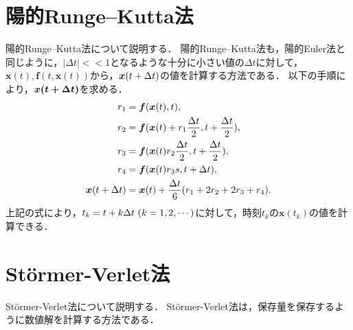 \section{陽的Runge--Kutta法}
陽的Runge--Kutta法について説明する．
陽的Runge--Kutta法も，陽的Euler法と同じように，$|\Delta t| << 1 $となるような十分に小さい値の$\Delta t$に対して，$\bm{x}(t),\bm{f}(t,\bm{x}(t))$から，$\bm{x}(t + \Delta t )$の値を計算する方法である．
以下の手順により，$\bm{x(t + \Delta t)}$を求める．
\begin{align}
    r_1 &= \bm{f}(\bm{x}(t),t), \\
    r_2 &= \bm{f}(\bm{x}(t)+r_1 \frac{\Delta t}{2},t + \frac{\Delta t}{2}), \\
    r_3 &= \bm{f}(\bm{x}(t)r_2 \frac{\Delta t}{2}, t + \frac{\Delta t}{2}), \\
    r_4 &= \bm{f}(\bm{x}(t)r_3 s, t + \Delta t), \\
    \bm{x}(t + \Delta t) &= \bm{x}(t) + \frac{\Delta t}{6}(r_1 + 2r_2 + 2r_3 + r_4).
\end{align}
上記の式により，$t_k = t + k\Delta t \ (k = 1,2,\cdots)$に対して，時刻$t_k$の$\bm{x}(t_k)$の値を計算できる．


\section{St\"ormer-Verlet法}
St\"ormer-Verlet法について説明する．
St\"ormer-Verlet法は，保存量を保存するように数値解を計算する方法である．
